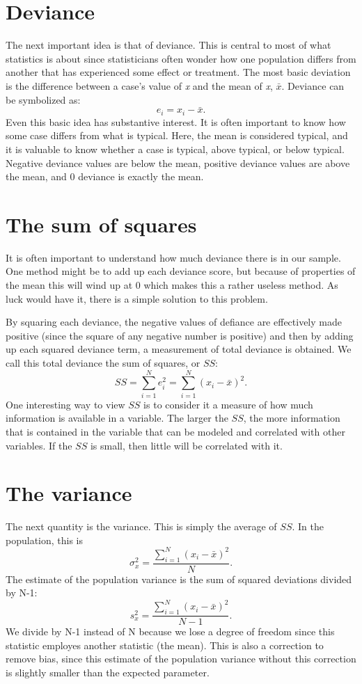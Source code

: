 \section{Deviance}
The next important idea is that of deviance. This is central to most of what statistics is about since statisticians often wonder how one population differs from another that has experienced some effect or treatment. The most basic deviation is the difference between a case's value of {\it x} and the mean of {\it x}, $\bar{x}$. Deviance can be symbolized as:
\begin{equation}
  e_i=x_i-\bar{x}.
\end{equation}
Even this basic idea has substantive interest. It is often important to know how some case differs from what is typical. Here, the mean is considered typical, and it is valuable to know whether a case is typical, above typical, or below typical. Negative deviance values are below the mean, positive deviance values are above the mean, and 0 deviance is exactly the mean.
\section{The sum of squares}
It is often important to understand how much deviance there is in our sample. One method might be to add up each deviance score, but because of properties of the mean this will wind up at 0 which makes this a rather useless method. As luck would have it, there is a simple solution to this problem.

By squaring each deviance, the negative values of defiance are effectively made positive (since the square of any negative number is positive) and then by adding up each squared deviance term, a measurement of total deviance is obtained. We call this total deviance the sum of squares, or $SS$:
\begin{equation}
  SS=\sum_{i=1}^{N}e_i^2={\sum_{i=1}^{N}(x_i-\bar{x})^2}.
\end{equation}
One interesting way to view $SS$ is to consider it a measure of how much information is available in a variable. The larger the $SS$, the more information that is contained in the variable that can be modeled and correlated with other variables. If the $SS$ is small, then little will be correlated with it.
\section{The variance}
The next quantity is the variance. This is simply the average of $SS$. In the population, this is
\begin{equation}
  \sigma_x^2=\frac{{\sum_{i=1}^{N}(x_i-\bar{x})^2}}{N}.
\end{equation}
The estimate of the population variance is the sum of squared deviations divided by N-1:
\begin{equation}
  s_x^2=\frac{{\sum_{i=1}^{N}(x_i-\bar{x})^2}}{N-1}.
\end{equation}
We divide by N-1 instead of N because we lose a degree of freedom since this statistic employes another statistic (the mean). This is also a correction to remove bias, since this estimate of the population variance without this correction is slightly smaller than the expected parameter.
